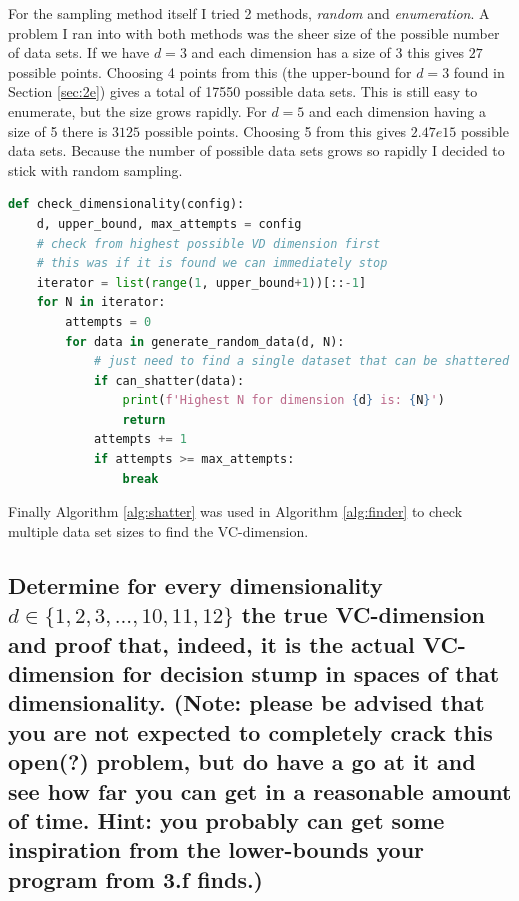 \documentclass[11pt,a4paper]{article}
\begin{document}
For the sampling method itself I tried 2 methods, \textit{random} and \textit{enumeration}. A problem I ran into with both methods was the sheer size of the possible number of data sets. If we have $d=3$ and each dimension has a size of $3$ this gives $27$ possible points. Choosing 4 points from this (the upper-bound for $d=3$ found in Section \ref{sec:2e}) gives a total of 17550 possible data sets. This is still easy to enumerate, but the size grows rapidly. For $d=5$ and each dimension having a size of 5 there is $3125$ possible points. Choosing 5 from this gives $2.47e15$ possible data sets. Because the number of possible data sets grows so rapidly I decided to stick with random sampling.

\begin{lstlisting}[language=Python, caption=Dimensionality Check, label={alg:finder}]
def check_dimensionality(config):
    d, upper_bound, max_attempts = config
    # check from highest possible VD dimension first
    # this was if it is found we can immediately stop
    iterator = list(range(1, upper_bound+1))[::-1]
    for N in iterator:
        attempts = 0
        for data in generate_random_data(d, N):
            # just need to find a single dataset that can be shattered
            if can_shatter(data):
                print(f'Highest N for dimension {d} is: {N}')
                return
            attempts += 1
            if attempts >= max_attempts:
                break
    \end{lstlisting}

Finally Algorithm \ref{alg:shatter} was used in Algorithm \ref{alg:finder} to check multiple data set sizes to find the VC-dimension.

\subsection{Determine for every dimensionality $d ∈ \{1, 2, 3, . . . , 10, 11, 12\}$ the true VC-dimension and proof that, indeed, it is the actual VC-dimension for decision stump in spaces of that dimensionality. (Note: please be advised that you are not expected to completely crack this open(?) problem, but do have a go at it and see how far you can get in a reasonable amount of time. Hint: you probably can get some inspiration from the lower-bounds your program from 3.f finds.)}
\label{sec:2g}
\end{document}
